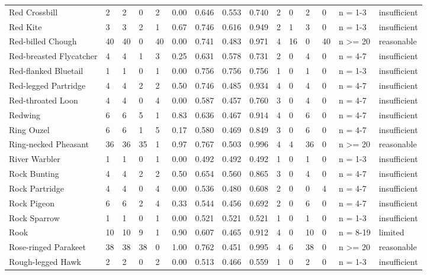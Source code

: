 \begin{landscape}
\begin{longtable}{L{3.6cm}*{12}{C{0.90cm}}L{1.45cm}L{1.65cm}}
Red Crossbill & 2 & 2 & 0 & 2 & 0.00 & 0.646 & 0.553 & 0.740 & 2 & 0 & 2 & 0 & n = 1-3 & insufficient \\
Red Kite & 3 & 3 & 2 & 1 & 0.67 & 0.746 & 0.616 & 0.949 & 2 & 1 & 3 & 0 & n = 1-3 & insufficient \\
Red-billed Chough & 40 & 40 & 0 & 40 & 0.00 & 0.741 & 0.483 & 0.971 & 4 & 16 & 0 & 40 & n >= 20 & reasonable \\
Red-breasted Flycatcher & 4 & 4 & 1 & 3 & 0.25 & 0.631 & 0.578 & 0.731 & 2 & 0 & 4 & 0 & n = 4-7 & insufficient \\
Red-flanked Bluetail & 1 & 1 & 0 & 1 & 0.00 & 0.756 & 0.756 & 0.756 & 1 & 0 & 1 & 0 & n = 1-3 & insufficient \\
Red-legged Partridge & 4 & 4 & 2 & 2 & 0.50 & 0.746 & 0.485 & 0.934 & 4 & 0 & 4 & 0 & n = 4-7 & insufficient \\
Red-throated Loon & 4 & 4 & 0 & 4 & 0.00 & 0.587 & 0.457 & 0.760 & 3 & 0 & 4 & 0 & n = 4-7 & insufficient \\
Redwing & 6 & 6 & 5 & 1 & 0.83 & 0.636 & 0.467 & 0.914 & 4 & 0 & 6 & 0 & n = 4-7 & insufficient \\
Ring Ouzel & 6 & 6 & 1 & 5 & 0.17 & 0.580 & 0.469 & 0.849 & 3 & 0 & 6 & 0 & n = 4-7 & insufficient \\
Ring-necked Pheasant & 36 & 36 & 35 & 1 & 0.97 & 0.767 & 0.503 & 0.996 & 4 & 4 & 36 & 0 & n >= 20 & reasonable \\
River Warbler & 1 & 1 & 0 & 1 & 0.00 & 0.492 & 0.492 & 0.492 & 1 & 0 & 1 & 0 & n = 1-3 & insufficient \\
Rock Bunting & 4 & 4 & 2 & 2 & 0.50 & 0.654 & 0.560 & 0.865 & 3 & 0 & 4 & 0 & n = 4-7 & insufficient \\
Rock Partridge & 4 & 4 & 0 & 4 & 0.00 & 0.536 & 0.480 & 0.608 & 2 & 0 & 0 & 4 & n = 4-7 & insufficient \\
Rock Pigeon & 6 & 6 & 2 & 4 & 0.33 & 0.544 & 0.456 & 0.692 & 2 & 0 & 6 & 0 & n = 4-7 & insufficient \\
Rock Sparrow & 1 & 1 & 0 & 1 & 0.00 & 0.521 & 0.521 & 0.521 & 1 & 0 & 1 & 0 & n = 1-3 & insufficient \\
Rook & 10 & 10 & 9 & 1 & 0.90 & 0.607 & 0.465 & 0.912 & 4 & 0 & 10 & 0 & n = 8-19 & limited \\
Rose-ringed Parakeet & 38 & 38 & 38 & 0 & 1.00 & 0.762 & 0.451 & 0.995 & 4 & 6 & 38 & 0 & n >= 20 & reasonable \\
Rough-legged Hawk & 2 & 2 & 0 & 2 & 0.00 & 0.513 & 0.466 & 0.559 & 1 & 0 & 2 & 0 & n = 1-3 & insufficient \\

\end{longtable}
\end{landscape}
